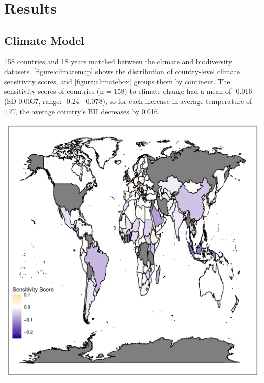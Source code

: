 \documentclass[11pt, a4paper, titlepage]{article}
\begin{document}
	
	

	\clearpage

	\section*{Results}
	 
	\subsection*{Climate Model}
	
	158 countries and 18 years matched between the climate and biodiversity datasets. \autoref{figure:climatemap} shows the distribution of country-level climate sensitivity scores, and \autoref{figure:climatebox} groups them by continent. The sensitivity scores of countries (n = 158) to climate change had a mean of -0.016 (SD 0.0037, range: -0.24 - 0.078), so for each increase in average temperature of $1^\circ C$, the average country's BII decreases by 0.016.\newline

	\includegraphics[scale=0.95]{../images/climatesensitivitymapgradient.pdf}
	\label{figure:climatemap}
\end{document}
